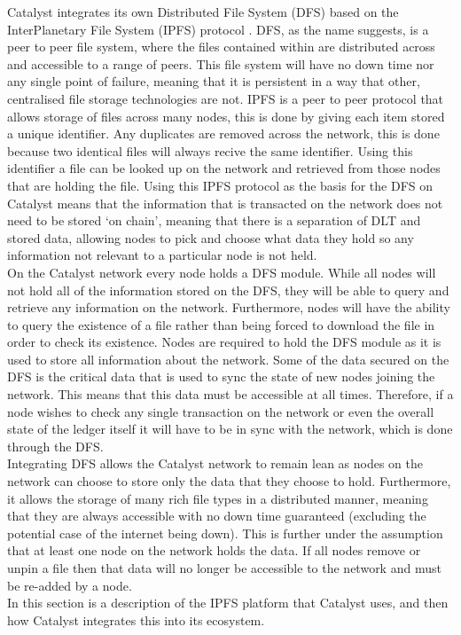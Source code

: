 Catalyst integrates its own Distributed File System (DFS) \cite{DFS} based on the InterPlanetary File System (IPFS) protocol \cite{benet2014ipfs}. DFS, as the name suggests, is a peer to peer file system, where the files contained within are distributed across and accessible to a range of peers. This file system will have no down time nor any single point of failure, meaning that it is persistent in a way that other, centralised file storage technologies are not. IPFS is a peer to peer protocol that allows storage of files across many nodes, this is done by giving each item stored a unique identifier. Any duplicates are removed across the network, this is done because two identical files will always recive the same identifier. Using this identifier a file can be looked up on the network and retrieved from those nodes that are holding the file. Using this IPFS protocol as the basis for the DFS on Catalyst means that the information that is transacted on the network does not need to be stored `on chain', meaning that there is a separation of DLT and stored data, allowing nodes to pick and choose what data they hold so any information not relevant to a particular node is not held. \\ %

On the Catalyst network every node holds a DFS module. While all nodes will not hold all of the information stored on the DFS, they will be able to query and retrieve any information on the network. Furthermore, nodes will have the ability to query the existence of a file rather than being forced to download the file in order to check its existence. Nodes are required to hold the DFS module as it is used to store all information about the network.  Some of the data secured on the DFS is the critical data that is used to sync the state of new nodes joining the network. This means that this data must be accessible at all times. Therefore, if a node wishes to check any single transaction on the network or even the overall state of the ledger itself it will have to be in sync with the network, which is done through the DFS.  \\ %

Integrating DFS allows the Catalyst network to remain lean as nodes on the network can choose to store only the data that they choose to hold. Furthermore, it allows the storage of many rich file types in a distributed manner, meaning that they are always accessible with no down time guaranteed (excluding the potential case of the internet being down). This is further under the assumption that at least one node on the network holds the data. If all nodes remove or unpin a file then that data will no longer be accessible to the network and must be re-added by a node. \\ %

In this section is a description of the IPFS platform that Catalyst uses, and then how Catalyst integrates this into its ecosystem.